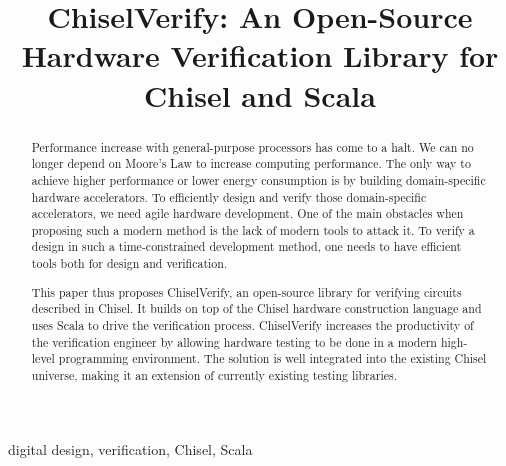 \documentclass[conference]{IEEEtran}
\title{ChiselVerify: An Open-Source Hardware Verification Library for
Chisel and Scala}
\author{
\IEEEauthorblockN{No Author Given}
\IEEEauthorblockA{No Institute Given}
}
\newcommand{\hjd}[1]{{\color{pink} Hans: #1}}
\begin{document}
\maketitle
\thispagestyle{plain}
\pagestyle{plain}


\begin{abstract}
Performance increase with general-purpose processors has come to a halt.
We can no longer depend on Moore's Law to increase computing performance.
The only way to achieve higher performance or lower energy consumption
is by building domain-specific hardware accelerators.
To efficiently design and verify those domain-specific accelerators, we need
agile hardware development. One of the main obstacles when proposing such a modern method
is the lack of modern tools to attack it. To verify a design in such a time-constrained development
method, one needs to have efficient tools both for design and verification.

This paper thus proposes ChiselVerify, an open-source library for verifying
circuits described in Chisel. It builds on top of the Chisel
hardware construction language and uses Scala to drive the verification process.
ChiselVerify increases the productivity of the verification engineer by allowing hardware testing to be done in a modern high-level programming environment.
The solution is well integrated into the existing Chisel universe, making it an extension of currently existing testing libraries.


\end{abstract}

\begin{IEEEkeywords}
digital design, verification, Chisel, Scala
\end{IEEEkeywords}


\end{document}
